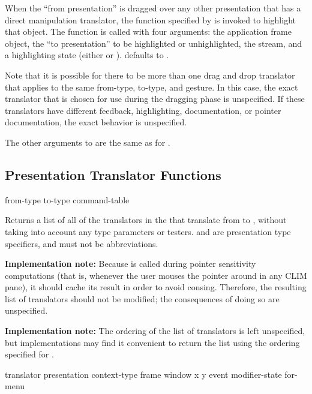 When the ``from presentation'' is dragged over any other presentation that has a
direct manipulation translator, the function specified by  is
invoked to highlight that object.  The function is called with four arguments:
the application frame object, the ``to presentation'' to be highlighted or
unhighlighted, the stream, and a highlighting state (either  or
).   defaults to
.

Note that it is possible for there to be more than one drag and drop translator
that applies to the same from-type, to-type, and gesture.  In this case, the
exact translator that is chosen for use during the dragging phase is
unspecified.  If these translators have different feedback, highlighting,
documentation, or pointer documentation, the exact behavior is unspecified.

The other arguments to  are the same as for
.


\subsection {Presentation Translator Functions}

 {from-type to-type command-table}

Returns a list of all of the translators in the 
 that translate from  to ,
without taking into account any type parameters or testers.   and
 are presentation type specifiers, and must not be abbreviations.

{\bf Implementation note:} Because  is called
during pointer sensitivity computations (that is, whenever the user mouses the
pointer around in any CLIM pane), it should cache its result in order to avoid
consing.  Therefore, the resulting list of translators should not be modified;
the consequences of doing so are unspecified.

{\bf Implementation note:} The ordering of the list of translators is left
unspecified, but implementations may find it convenient to return the list using
the ordering specified for .


 {translator presentation context-type frame window x y
                                       \key event modifier-state for-menu}

